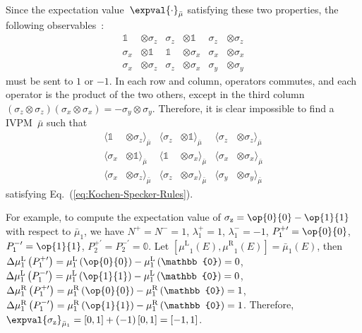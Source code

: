 \documentclass[english,reprint, aps, prl,superscriptaddress, showpacs,
showkeys, longbibliography, amsmath, amssymb]{revtex4-1}
\theoremstyle{plain}
\theoremstyle{definition}
\newcommand{\proj}[1]{\op{#1}{#1}}
\newcommand{\mul}{\ensuremath{\mu^{\mathrm{L}}}}
\newcommand{\mur}{\ensuremath{\mu^{\mathrm{R}}}}
\begin{document}
Since the expectation value~$\expval{\cdot}_{\bar{\mu}}$ satisfying
these two properties, the following observables~\cite{Mermin1990Simple,peres1995quantum}:
\begin{equation}
\begin{aligned}\mathbb{1} & \otimes\sigma_{z} & \sigma_{z} & \otimes\mathbb{1} & \sigma_{z} & \otimes\sigma_{z}\\
\sigma_{x} & \otimes\mathbb{1} & \mathbb{1} & \otimes\sigma_{x} & \sigma_{x} & \otimes\sigma_{x}\\
\sigma_{x} & \otimes\sigma_{z} & \sigma_{z} & \otimes\sigma_{x} & \sigma_{y} & \otimes\sigma_{y}
\end{aligned}
\label{eq:MerminSquare}
\end{equation}
must be sent to $1$ or $-1$. In each row and column, operators commutes,
and each operator is the product of the two others, except in the
third column $\left(\sigma_{z}\otimes\sigma_{z}\right)\left(\sigma_{x}\otimes\sigma_{x}\right)=-\sigma_{y}\otimes\sigma_{y}$.
Therefore, it is clear impossible to find a IVPM~$\bar{\mu}$ such
that 
\begin{equation}
\begin{aligned}\langle\mathbb{1} & \otimes\sigma_{z}\rangle_{\bar{\mu}} & \langle\sigma_{z} & \otimes\mathbb{1}\rangle_{\bar{\mu}} & \langle\sigma_{z} & \otimes\sigma_{z}\rangle_{\bar{\mu}}\\
\langle\sigma_{x} & \otimes\mathbb{1}\rangle_{\bar{\mu}} & \langle\mathbb{1} & \otimes\sigma_{x}\rangle_{\bar{\mu}} & \langle\sigma_{x} & \otimes\sigma_{x}\rangle_{\bar{\mu}}\\
\langle\sigma_{x} & \otimes\sigma_{z}\rangle_{\bar{\mu}} & \langle\sigma_{z} & \otimes\sigma_{x}\rangle_{\bar{\mu}} & \langle\sigma_{y} & \otimes\sigma_{y}\rangle_{\bar{\mu}}
\end{aligned}
\label{eq:MerminSquare-values}
\end{equation}
satisfying Eq.~(\ref{eq:Kochen-Specker-Rules}).

\newpage{}

For example, to compute the expectation value of $\sigma_{\mathrm{z}}=\proj{0}-\proj{1}$
with respect to $\bar{\mu}_{1}$, we have $N^{+}=N^{-}=1$, $\lambda_{1}^{+}=1$,
$\lambda_{1}^{-}=-1$, $P_{1}^{+\prime}=\proj{0}$, $P_{1}^{-\prime}=\proj{1}$,
$P_{2}^{+\prime}=P_{2}^{-\prime}=\mathbb{0}$. Let $\left[\mul_{1}\left(E\right),\mur_{1}\left(E\right)\right]=\bar{\mu}_{1}\left(E\right)$,
then $\Delta\mul_{1}\left(P_{1}^{+\prime}\right)=\mul_{1}\left(\proj{0}\right)-\mul_{1}\left(\mathbb{0}\right)=0$,
$\Delta\mul_{1}\left(P_{1}^{-\prime}\right)=\mul_{1}\left(\proj{1}\right)-\mul_{1}\left(\mathbb{0}\right)=0$,
$\Delta\mur_{1}\left(P_{1}^{+\prime}\right)=\mur_{1}\left(\proj{0}\right)-\mur_{1}\left(\mathbb{0}\right)=1$,
$\Delta\mur_{1}\left(P_{1}^{-\prime}\right)=\mur_{1}\left(\proj{1}\right)-\mur_{1}\left(\mathbb{0}\right)=1$.
Therefore, $\expval{\sigma_{\mathrm{z}}}_{\bar{\mu}_{1}}=\left[0,1\right]+\left(-1\right)\left[0,1\right]=\left[-1,1\right]$.
\end{document}
